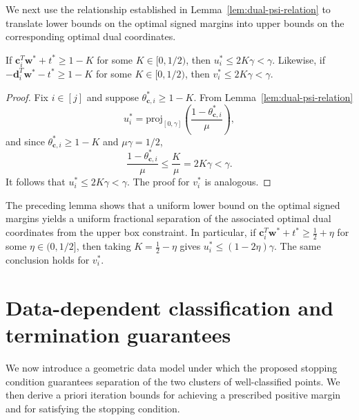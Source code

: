 \documentclass[twoside,11pt]{article}
\newcommand\proj{\mathrm{proj}}
\renewcommand{\c}{\bm{c}}
\renewcommand{\d}{\bm{d}}
\newcommand\w{\bm{w}}
\begin{document}
We next use the relationship established in Lemma~\ref{lem:dual-psi-relation} to translate lower bounds on the optimal signed margins into upper bounds on the corresponding optimal dual coordinates.

\begin{lemma} \label{lem:Hsvm-u-bounded-away}
  If $\c_i^T\w^* + t^* \geq 1 - K$ for some $K \in [0,1/2)$, then $u_i^* \leq 2K\gamma < \gamma$. Likewise,
  if $-\d_i^T\w^* - t^* \geq 1 - K$ for some $K \in [0,1/2)$, then $v_i^* \leq 2K\gamma < \gamma$.
\end{lemma}
\begin{proof}
    Fix $i \in [j]$ and suppose $\theta^*_{\c,i} \geq 1 - K$. From Lemma~\ref{lem:dual-psi-relation}
    \[
        u_i^* = \proj_{[0,\gamma]}\left(\frac{1-\theta_{\c,i}^*}{\mu}\right),
    \]
    and since $\theta_{\c,i}^* \geq 1 - K$ and $\mu\gamma = 1/2$,
    \[
        \frac{1-\theta_{\c,i}^*}{\mu} \leq \frac{K}{\mu} = 2K\gamma < \gamma.
    \]
    It follows that $u_i^* \leq 2K\gamma < \gamma$. The proof for $v_i^*$ is analogous.
\end{proof}
The preceding lemma shows that a uniform lower bound on the optimal signed margins yields a uniform fractional separation of the associated optimal dual coordinates from the upper box constraint. In particular, if $\c_i^T\w^* + t^* \geq \frac{1}{2} + \eta$ for some $\eta \in (0,1/2]$, then taking $K = \frac{1}{2} - \eta$ gives $u_i^* \leq (1-2\eta)\gamma$. The same conclusion holds for $v_i^*$.

\section{Data-dependent classification and termination guarantees} \label{sec:data-dep}
We now introduce a geometric data model under which the proposed stopping condition guarantees separation of the two clusters of well-classified points. We then derive a priori iteration bounds for achieving a prescribed positive margin and for satisfying the stopping condition.
\end{document}

